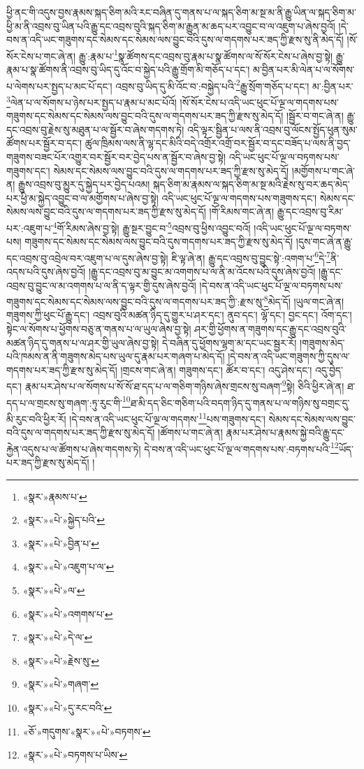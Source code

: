 ཕྱི་ནང་གི་འདུས་བྱས་རྣམས་སྐད་ཅིག་མའི་རང་བཞིན་དུ་གནས་པ་ལ་སྐད་ཅིག་མ་སྔ་མ་ནི་རྒྱུ་ཡིན་ལ་སྐད་ཅིག་མ་ཕྱི་མ་ནི་འབྲས་བུ་ཡིན་པའི་རྒྱུ་དང་འབྲས་བུའི་སྐད་ཅིག་མ་རྒྱུན་མ་ཆད་པར་འབྱུང་བ་ལ་འཇུག་པ་ཞེས་བྱའོ། །དེ་བས་ན་འདི་ཡང་གཟུགས་དང་སེམས་དང་སེམས་ལས་བྱུང་བའི་དུས་ལ་གདགས་པར་ཟད་ཀྱི་རྫས་སུ་ནི་མེད་དོ། །སོ་སོར་ངེས་པ་གང་ཞེ་ན། རྒྱུ་:རྣམ་པ་\footnote{«སྣར་»རྣམས་པ་}སྣ་ཚོགས་དང་འབྲས་བུ་རྣམ་པ་སྣ་ཚོགས་ལ་སོ་སོར་ངེས་པ་ཞེས་བྱ་སྟེ། རྒྱུ་རྣམ་པ་སྣ་ཚོགས་ནི་འབྲས་བུ་ཡིད་དུ་འོང་བ་སྐྱེད་པའི་རྒྱུ་གྲོག་མི་གཅོད་པ་དང་། མ་བྱིན་པར་མི་ལེན་པ་ལ་སོགས་པ་ལེགས་པར་སྤྱད་པ་མང་པོ་དང་། འབྲས་བུ་ཡིད་དུ་མི་འོང་བ་:བསྐྱེད་པའི་\footnote{«སྣར་»«པེ་»སྐྱེད་པའི་}རྒྱུ་སྲོག་གཅོད་པ་དང་། མ་:བྱིན་པར་\footnote{«སྣར་»«པེ་»བྱིན་པ་}ལེན་པ་ལ་སོགས་པ་ཉེས་པར་སྤྱད་པ་རྣམ་པ་མང་པོའོ། །སོ་སོར་ངེས་པ་འདི་ཡང་ཕུང་པོ་ལྔ་ལ་གདགས་པས་གཟུགས་དང་སེམས་དང་སེམས་ལས་བྱུང་བའི་དུས་ལ་གདགས་པར་ཟད་ཀྱི་རྫས་སུ་མེད་དོ། །སྦྱོར་བ་གང་ཞེ་ན། རྒྱུ་དང་འབྲས་བུ་རྗེས་སུ་མཐུན་པ་ལ་སྦྱོར་བ་ཞེས་གདགས་ཏེ། འདི་ལྟར་སྦྱིན་པ་ལས་ནི་འབྲས་བུ་ལོངས་སྤྱོད་ཕུན་སུམ་ཚོགས་པར་སྦྱོར་བ་དང་། ཚུལ་ཁྲིམས་ལས་ནི་ལྷ་དང་མིའི་བདེ་འགྲོར་འགྲོ་བར་སྦྱོར་བ་དང་བཟོད་པ་ལས་ནི་བྱད་གཟུགས་བཟང་པོར་འགྱུར་བར་སྦྱོར་བར་བྱེད་པས་ན་སྦྱོར་བ་ཞེས་བྱ་སྟེ། འདི་ཡང་ཕུང་པོ་ལྔ་ལ་བཏགས་པས་གཟུགས་དང་། སེམས་དང་སེམས་ལས་བྱུང་བའི་དུས་ལ་གདགས་པར་ཟད་ཀྱི་རྫས་སུ་མེད་དོ། །མགྱོགས་པ་གང་ཞེ་ན། རྒྱུས་འབྲས་བུ་མྱུར་དུ་སྐྱེད་པར་བྱེད་པའམ། སྐད་ཅིག་མ་རྣམས་ལ་སྐད་ཅིག་མ་སྔ་མའི་རྗེས་སུ་བར་ཆད་མེད་པར་ཕྱི་མ་སྐྱེད་འབྱུང་བ་ལ་མགྱོགས་པ་ཞེས་བྱ་སྟེ། འདི་ཡང་ཕུང་པོ་ལྔ་ལ་གདགས་པས་གཟུགས་དང་། སེམས་དང་སེམས་ལས་བྱུང་བའི་དུས་ལ་གདགས་པར་ཟད་ཀྱི་རྫས་སུ་མེད་དོ། །གོ་རིམས་གང་ཞེ་ན། རྒྱུ་དང་འབྲས་བུ་རིམ་པར་:འཇུག་པ་\footnote{«སྣར་»«པེ་»འཇུག་པ་ལ་}གོ་རིམས་ཞེས་བྱ་སྟེ། རྒྱུ་སྔར་བྱུང་བ་\footnote{«སྣར་»«པེ་»ལ་}འབྲས་བུ་ཕྱིས་འབྱུང་བའོ། །འདི་ཡང་ཕུང་པོ་ལྔ་ལ་བཏགས་པས། གཟུགས་དང་སེམས་དང་སེམས་ལས་བྱུང་བའི་དུས་གདགས་པར་ཟད་ཀྱི་རྫས་སུ་མེད་དོ། །དུས་གང་ཞེ་ན་རྒྱུ་དང་འབྲས་བུ་འབྲེལ་བར་འཇུག་པ་ལ་དུས་ཞེས་བྱ་སྟེ། ཇི་ལྟ་ཞེ་ན། རྒྱུ་དང་འབྲས་བུ་བྱུང་སྟེ་:འགག་པ་\footnote{«སྣར་»«པེ་»འགགས་པ་}དེ་\footnote{«སྣར་»«པེ་»དེ་ལ་}ནི་འདས་པའི་དུས་ཞེས་བྱའོ། །རྒྱུ་དང་འབྲས་བུ་མ་བྱུང་མ་འགགས་པ་ལ་ནི་མ་འོངས་པའི་དུས་ཞེས་བྱའོ། །རྒྱུ་དང་འབྲས་བུ་བྱུང་ལ་མ་འགགས་པ་ལ་ནི་ད་ལྟར་གྱི་དུས་ཞེས་བྱའོ། །དེ་བས་ན་འདི་ཡང་ཕུང་པོ་ལྔ་ལ་བཏགས་པས་གཟུགས་དང་སེམས་དང་སེམས་ལས་བྱུང་བའི་དུས་ལ་གདགས་པར་ཟད་ཀྱི་:རྫས་སུ་\footnote{«སྣར་»«པེ་»རྗེས་སུ་}མེད་དོ། །ཡུལ་གང་ཞེ་ན། གཟུགས་ཀྱི་ཕུང་པོ་རྒྱུ་དང་། འབྲས་བུའི་མཚན་ཉིད་དུ་གྱུར་པ་ཤར་དང་། ནུབ་དང་། ལྷོ་དང་། བྱང་དང་། འོག་དང་། སྟེང་ལ་སོགས་པ་ཕྱོགས་བཅུ་ན་གནས་པ་ལ་ཡུལ་ཞེས་བྱ་སྟེ། ཤར་གྱི་ཕྱོགས་ན་གཟུགས་དང་རྒྱུ་དང་འབྲས་བུའི་མཚན་ཉིད་དུ་གནས་པ་ལ་ཤར་གྱི་ཡུལ་ཞེས་བྱ་སྟེ། དེ་བཞིན་དུ་ཕྱོགས་ལྷག་མ་དང་ཡང་སྦྱར་རོ། །གཟུགས་མེད་པའི་ཁམས་ན་ནི་གཟུགས་མེད་པས་ཡུལ་དུ་རྣམ་པར་གཞག་པ་མེད་དོ། །དེ་བས་ན་འདི་ཡང་གཟུགས་ཀྱི་དུས་ལ་གདགས་པར་ཟད་ཀྱི་རྫས་སུ་མེད་དོ། །གྲངས་གང་ཞེ་ན། གཟུགས་དང་། ཚོར་བ་དང་། འདུ་ཤེས་དང་། འདུ་བྱེད་དང་། རྣམ་པར་ཤེས་པ་ལ་སོགས་པ་སོ་སོ་ཐ་དད་པ་ལ་གཅིག་གཉིས་ཞེས་གྲངས་སུ་བཞག་\footnote{«སྣར་»«པེ་»གཞག་}སྟེ། ཅིའི་ཕྱིར་ཞེ་ན། ཐ་དད་པ་ལ་གྲངས་སུ་གཞག་:ཏུ་རུང་གི་\footnote{«སྣར་»«པེ་»དུ་རང་བའི་}ཐ་མི་དད་ཅིང་གཅིག་པའི་བདག་ཉིད་དུ་གནས་པ་ལ་གཉིས་སུ་བགྲང་དུ་མི་རུང་བའི་ཕྱིར་རོ། །དེ་བས་ན་འདི་ཡང་ཕུང་པོ་ལྔ་ལ་གདགས་\footnote{«ཅོ་»གདུགས་«སྣར་»«པེ་»བཏགས་}པས་གཟུགས་དང་། སེམས་དང་སེམས་ལས་བྱུང་བའི་དུས་ལ་གདགས་པར་ཟད་ཀྱི་རྫས་སུ་མེད་དོ། །ཚོགས་པ་གང་ཞེ་ན། རྣམ་པར་ཤེས་པ་རྣམས་སྐྱེ་བའི་རྒྱུ་དང་རྐྱེན་འདུས་པ་ལ་ཚོགས་པ་ཞེས་གདགས་ཏེ། དེ་བས་ན་འདི་ཡང་ཕུང་པོ་ལྔ་ལ་གདགས་པས་:བཏགས་པའི་\footnote{«སྣར་»«པེ་»བཏགས་པ་ཡིས་}ཡོད་པར་ཟད་ཀྱི་རྫས་སུ་མེད་དོ། །
